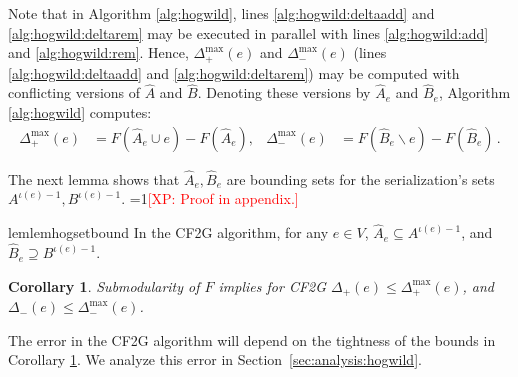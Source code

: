 \documentclass{article} %
\newcommand{\hogwild}{CF2G}
\newtheorem{cor}[thm]{Corollary}
\newcommand{\Comments}{1}
\newcommand{\note}[2]{\ifnum\Comments=1\textcolor{#1}{#2}\fi}
\newcommand{\xinghao}[1]{\note{red}{[XP: #1]}}
\newcommand{\secref}[1]{Section~\ref{#1}}
\begin{document}
Note that in Algorithm \ref{alg:hogwild}, lines \ref{alg:hogwild:deltaadd} and \ref{alg:hogwild:deltarem} may be executed in parallel with lines \ref{alg:hogwild:add} and \ref{alg:hogwild:rem}.
Hence, $\Delta_+^{\max}(e)$ and $\Delta_-^{\max}(e)$ (lines \ref{alg:hogwild:deltaadd} and \ref{alg:hogwild:deltarem}) may be computed with conflicting versions of $\hat{A}$ and $\hat{B}$.
Denoting these versions by $\hat{A}_e$ and $\hat{B}_e$, Algorithm \ref{alg:hogwild} computes:
\begin{align*}
  \Delta_{+}^{\max}(e) &= F(\hat{A}_e\cup e) - F(\hat{A}_e),
& \Delta_{-}^{\max}(e) &= F(\hat{B}_e\backslash e) - F(\hat{B}_e) \, .
\end{align*}

The next lemma shows that $\hat{A}_e, \hat{B}_e$ are bounding sets for the serialization's sets $A^{\iota(e)-1}, B^{\iota(e)-1}$.
\xinghao{Proof in appendix.}

\begin{restatable}{lem}{lemhogsetbound}\label{lem:hog:set_bound}
In the \hogwild{} algorithm, for any $e\in V$, $\hat{A}_e \subseteq A^{\iota(e)-1}$, and $\hat{B}_e \supseteq B^{\iota(e)-1}$.
\end{restatable}

\begin{cor}\label{cor:hog:delta_bound}
Submodularity of $F$ implies for \hogwild{}
$\Delta_{+}(e) \leq \Delta_{+}^{\max}(e)$, and
$\Delta_{-}(e) \leq \Delta_{-}^{\max}(e)$.
\end{cor}

The error in the \hogwild{} algorithm will depend on the tightness of the bounds in Corollary \ref{cor:hog:delta_bound}.
We analyze this error in \secref{sec:analysis:hogwild}.

\end{document}

